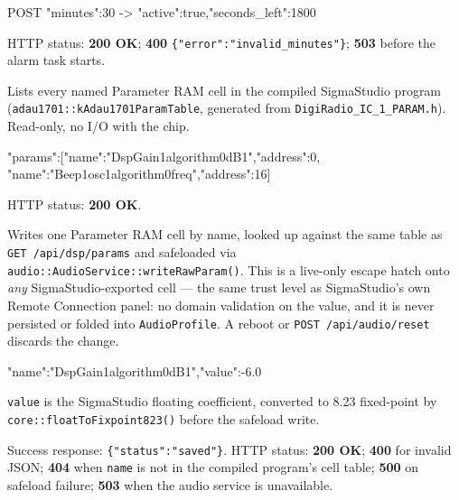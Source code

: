 \begin{drnote}
\begin{drcode}[JSON]
POST {"minutes":30}
  -> {"active":true,"seconds_left":1800}
\end{drcode}
\end{drnote}

HTTP status: \textbf{200 OK}; \textbf{400}
\texttt{\{"error":"invalid\_minutes"\}}; \textbf{503} before the alarm task
starts.

\label{sec:api-dsp-params}

Lists every named Parameter RAM cell in the compiled SigmaStudio program
(\texttt{adau1701::kAdau1701ParamTable}, generated from
\texttt{DigiRadio\_IC\_1\_PARAM.h}). Read-only, no I/O with the chip.

\begin{drnote}
\begin{drcode}[JSON]
{"params":[{"name":"DspGain1algorithm0dB1","address":0},
           {"name":"Beep1osc1algorithm0freq","address":16}]}
\end{drcode}
\end{drnote}

HTTP status: \textbf{200 OK}.

\label{sec:api-dsp-param}

Writes one Parameter RAM cell by name, looked up against the same table as
\texttt{GET /api/dsp/params} and safeloaded via
\texttt{audio::AudioService::writeRawParam()}. This is a live-only escape
hatch onto \emph{any} SigmaStudio-exported cell --- the same trust level as
SigmaStudio's own Remote Connection panel: no domain validation on the
value, and it is never persisted or folded into \texttt{AudioProfile}. A
reboot or \texttt{POST /api/audio/reset} discards the change.

\begin{drnote}
\begin{drcode}[JSON]
{"name":"DspGain1algorithm0dB1","value":-6.0}
\end{drcode}
\texttt{value} is the SigmaStudio floating coefficient, converted to
8.23 fixed-point by \texttt{core::floatToFixpoint823()} before the
safeload write.
\end{drnote}

Success response: \texttt{\{"status":"saved"\}}. HTTP status:
\textbf{200 OK}; \textbf{400} for invalid JSON; \textbf{404} when
\texttt{name} is not in the compiled program's cell table; \textbf{500}
on safeload failure; \textbf{503} when the audio service is unavailable.

